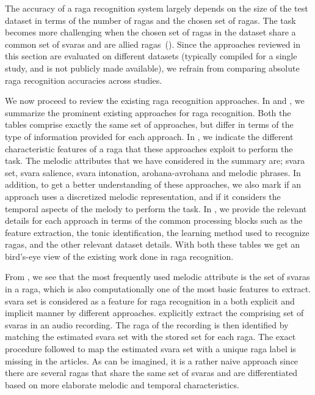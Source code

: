 The accuracy of a \gls{raga} recognition system largely depends on the size of the test dataset in terms of the number of \glspl{raga} and the chosen set of \glspl{raga}. The task becomes more challenging when the chosen set of \glspl{raga} in the dataset share a common set of \glspl{svara} and are allied \glspl{raga}~(). Since the approaches reviewed in this section are evaluated on different datasets (typically compiled for a single study, and is not publicly made available), we refrain from comparing absolute \gls{raga} recognition accuracies across studies. 

We now proceed to review the existing \gls{raga} recognition approaches. In  and , we summarize the prominent existing approaches for \gls{raga} recognition. Both the tables comprise exactly the same set of approaches, but differ in terms of the type of information provided for each approach. In , we indicate the different characteristic features of a \gls{raga} that these approaches exploit to perform the task. The melodic attributes that we have considered in the summary are; \gls{svara} set, \gls{svara} salience, \gls{svara} intonation, \gls{arohana}-\gls{avrohana} and melodic phrases. In addition, to get a better understanding of these approaches, we also mark if an approach uses a discretized melodic representation, and if it considers the temporal aspects of the melody to perform the task. In , we provide the relevant details for each approach in terms of the common processing blocks such as the feature extraction, the tonic identification, the learning method used to recognize \glspl{raga}, and the other relevant dataset details. With both these tables we get an bird's-eye view of the existing work done in \gls{raga} recognition.

From , we see that the most frequently used melodic attribute is the set of \glspl{svara} in a \gls{raga}, which is also computationally one of the most basic features to extract. \Gls{svara} set is considered as a feature for \gls{raga} recognition in a both explicit and implicit manner by different approaches. \citep{chakraborty2012object,ranjani2011carnatic} explicitly extract the comprising set of \glspl{svara} in an audio recording. The \gls{raga} of the recording is then identified by matching the estimated \gls{svara} set with the stored set for each \gls{raga}. The exact procedure followed to map the estimated \gls{svara} set with a unique \gls{raga} label is missing in the articles. As can be imagined, it is a rather naive approach since there are several \glspl{raga} that share the same set of \glspl{svara} and are differentiated based on more elaborate melodic and temporal characteristics.

